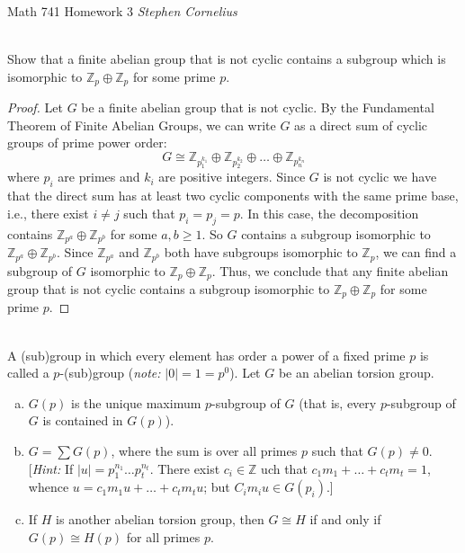\documentclass{article}
\def\zz{{\mathbb Z}}
\begin{document}
\begin{center}
    Math 741
    \hfill Homework 3
    \hfill \textit{Stephen Cornelius}
\end{center}



\begin{problem}[II.2.1] \\ 
    Show that a finite abelian group that is not cyclic contains a subgroup which is isomorphic to $\zz_p \oplus \zz_p$ for some prime $p$.
\end{problem}


\begin{proof}
    Let $G$ be a finite abelian group that is not cyclic. By the Fundamental Theorem of Finite Abelian Groups, we can write $G$ as a direct sum of cyclic groups of prime power order:
    \[
        G \cong \zz_{p_1^{k_1}} \oplus \zz_{p_2^{k_2}} \oplus \dots \oplus \zz_{p_n^{k_n}}
    \]
    where $p_i$ are primes and $k_i$ are positive integers. Since $G$ is not cyclic we have that the direct sum has at least two cyclic components with the same prime base, i.e., there exist $i \neq j$ such that $p_i = p_j = p$. In this case, the decomposition contains $\zz_{p^a}\oplus \zz_{p^b}$ for some $a, b \geq 1$. So $G$ contains a subgroup isomorphic to $\zz_{p^a} \oplus \zz_{p^b}$. Since $\zz_{p^a}$ and $\zz_{p^b}$ both have subgroups isomorphic to $\zz_p$, we can find a subgroup of $G$ isomorphic to $\zz_p \oplus \zz_p$. Thus, we conclude that any finite abelian group that is not cyclic contains a subgroup isomorphic to $\zz_p \oplus \zz_p$ for some prime $p$.
\end{proof}


\begin{problem}[II.2.7] \\
    A (sub)group in which every element has order a power of a fixed prime $p$ is called a $p$-(sub)group (\textit{note:} $\vert 0 \vert = 1 = p^0$). Let $G$ be an abelian torsion group. 
    \begin{enumerate}[(a)]
        \item $G(p)$ is the unique maximum $p$-subgroup of $G$ (that is, every $p$-subgroup of $G$ is contained in $G(p)$).
        \item $G = \sum G(p)$, where the sum is over all primes $p$ such that $G(p) \neq 0$. \\
        {[}\textit{Hint:} If $|u| = p_1^{n_1} \dots p_t^{n_t}$. There exist $c_i \in \zz$ uch that $c_1m_1 + \dots + c_tm_t = 1$, whence $u = c_1m_1u + \dots + c_tm_tu$; but $C_im_iu \in G(p_i)$.{]}
        \item If $H$ is another abelian torsion group, then $G \cong H$ if and only if $G(p) \cong H(p)$ for all primes $p$.
    \end{enumerate}
\end{problem}
\end{document}

